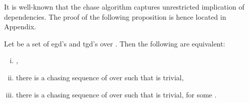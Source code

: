 \documentclass[envcountset]{llncs}
\begin{document}
It is well-known that the chase algorithm captures unrestricted implication of dependencies. The proof of the following proposition is hence located in Appendix.
\begin{proposition}\label{chase}
Let  be a set of egd's and tgd's over  . Then the following are equivalent:
\begin{enumerate}[(i)]
\item ,
\item there is a chasing sequence  of  over  such that   is trivial,
\item there is a chasing sequence  of  over  such that   is trivial, for some .
\end{enumerate}
\end{proposition}
\end{document}
